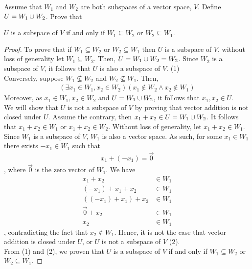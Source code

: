 \begin{question}\label{que:SubspaceUnion}
	\normalfont
	
	Assume that $W_1$ and $W_2$ are both subspaces of a vector space, $V$.  Define $U=W_1\cup W_2$.  Prove that 
	\begin{center}
		$U$ is a subspace of $V$ if and only if $W_1\subseteq W_2$ or $W_2\subseteq W_1$.  
	\end{center}
	
\end{question}
\renewcommand{\qedsymbol}{$\blacksquare$}
\begin{proof}
    To prove that if $W_1\subseteq W_2$ or $W_2\subseteq W_1$ then $U$ is a subspace of $V$, without loss of generality let $W_1\subseteq W_2$. Then, $U=W_1\cup W_2=W_2$. Since $W_2$ is a subspace of $V$, it follows that $U$ is also a subspace of $V$. (1)\\
    Conversely, suppose $W_1\not\subseteq W_2$ and $W_2\not\subseteq W_1$. Then, 
    \[
        \begin{aligned}
            (\exists x_1\in W_1, x_2\in W_2)(x_1\not\in W_2\land x_2\not\in W_1)
        \end{aligned}
    \]Moreover, as $x_1\in W_1, x_2\in W_2$ and $U=W_1\cup W_2$, it follows that $x_1,x_2\in U$.\\
    We will show that $U$ is not a subspace of $V$ by proving that vector addition is not closed under $U$. Assume the contrary, then $x_1+x_2\in U=W_1\cup W_2$. It follows that $x_1+x_2\in W_1$ or $x_1+x_2\in W_2$. Without loss of generality, let $x_1+x_2\in W_1$. Since $W_1$ is a subspace of $V$, $W_1$ is also a vector space. As such, for some $x_1\in W_1$ there exists $-x_1\in W_1$ such that 
    \[
        \begin{aligned}
            x_1+(-x_1)=\vec{0}
        \end{aligned}
    \], where $\vec{0}$ is the zero vector of $W_1.$ We have 
    \[
        \begin{aligned}
            x_1+x_2          &\in W_1\\
            (-x_1)+x_1+x_2   &\in W_1\\
            ((-x_1)+x_1)+x_2 &\in W_1\\
            \vec{0}+x_2      &\in W_1\\
            x_2              &\in W_1
        \end{aligned}
    \], contradicting the fact that $x_2\not\in W_1$. Hence, it is not the case that vector addition is closed under $U$, or $U$ is not a subspace of $V$ (2).\\ 
    From (1) and (2), we proven that $U$ is a subspace of $V$ if and only if $W_1\subseteq W_2$ or $W_2\subseteq W_1$.
\end{proof}